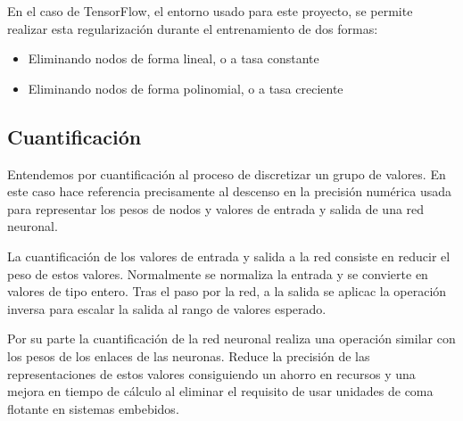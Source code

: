 \documentclass[../tfm.tex]{subfiles}
\begin{document}
En el caso de TensorFlow, el entorno usado para este proyecto, se permite realizar esta regularización durante el entrenamiento de dos formas:

\begin{itemize}
\item Eliminando nodos de forma lineal, o a tasa constante
\item Eliminando nodos de forma polinomial, o a tasa creciente
\end{itemize}

\subsection{Cuantificación}
Entendemos por cuantificación al proceso de discretizar un grupo de valores. En este caso hace referencia precisamente al descenso en la precisión numérica usada para representar los pesos de nodos y valores de entrada y salida de una red neuronal.

La cuantificación de los valores de entrada y salida a la red consiste en reducir el peso de estos valores. Normalmente se normaliza la entrada y se convierte en valores de tipo entero. Tras el paso por la red, a la salida se aplicac la operación inversa para escalar la salida al rango de valores esperado.

Por su parte la cuantificación de la red neuronal realiza una operación similar con los pesos de los enlaces de las neuronas. Reduce la precisión de las representaciones de estos valores consiguiendo un ahorro en recursos y una mejora en tiempo de cálculo al eliminar el requisito de usar unidades de coma flotante en sistemas embebidos.
\end{document}
